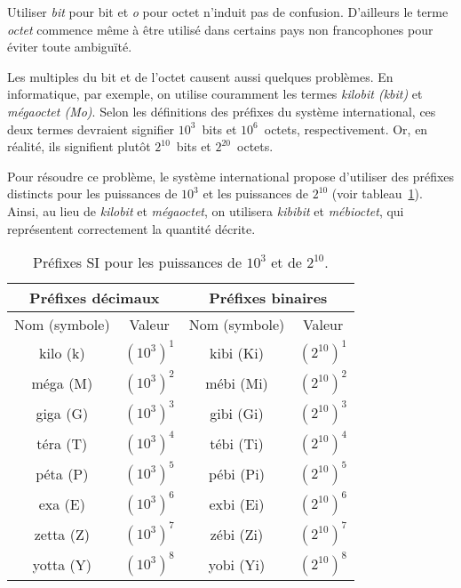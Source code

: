 \documentclass[canadien,12pt,oneside,letterpaper]{article}
\begin{document}
Utiliser \textit{bit} pour bit et \textit{o} pour octet n'induit pas de confusion. D'ailleurs le terme \textit{octet} commence même à être utilisé dans certains pays non francophones pour éviter toute ambiguïté.

Les multiples du bit et de l'octet causent aussi quelques problèmes. En informatique, par exemple, on utilise couramment les termes \textit{kilobit (kbit)} et \textit{mégaoctet (Mo)}. Selon les définitions des préfixes du système international, ces deux termes devraient signifier $10^3$~bits et $10^6$~octets, respectivement. Or, en réalité, ils signifient plutôt $2^{10}$~bits et $2^{20}$~octets.

Pour résoudre ce problème, le système international propose d'utiliser des préfixes distincts pour les puissances de $10^3$ et les puissances de $2^{10}$ (voir tableau~\ref{prefixes-si}). Ainsi, au lieu de \textit{kilobit} et \textit{mégaoctet}, on utilisera \textit{kibibit} et \textit{mébioctet}, qui représentent correctement la quantité décrite.

\begin{table}[h]
\begin{center}
\begin{tabular}{|c|c|c|c|}
\hline
\multicolumn{2}{|c|}{Préfixes décimaux} & \multicolumn{2}{|c|}{Préfixes binaires} \\
\hline
Nom (symbole) & Valeur & Nom (symbole) & Valeur \\
\hline
kilo (k) & $\left(10^3\right)^1$ & kibi (Ki) & $\left(2^{10}\right)^1$ \\
\hline
méga (M) & $\left(10^3\right)^2$ & mébi (Mi) & $\left(2^{10}\right)^2$ \\
\hline
giga (G) & $\left(10^3\right)^3$ & gibi (Gi) & $\left(2^{10}\right)^3$ \\
\hline
téra (T) & $\left(10^3\right)^4$ & tébi (Ti) & $\left(2^{10}\right)^4$ \\
\hline
péta (P) & $\left(10^3\right)^5$ & pébi (Pi) & $\left(2^{10}\right)^5$ \\
\hline
exa (E) & $\left(10^3\right)^6$ & exbi (Ei) & $\left(2^{10}\right)^6$ \\
\hline
zetta (Z) & $\left(10^3\right)^7$ & zébi (Zi) & $\left(2^{10}\right)^7$ \\
\hline
yotta (Y) & $\left(10^3\right)^8$ & yobi (Yi) & $\left(2^{10}\right)^8$ \\
\hline
\end{tabular}
\end{center}
\caption{\label{prefixes-si}Préfixes SI pour les puissances de $10^3$ et de $2^{10}$.}
\end{table}
\end{document}
